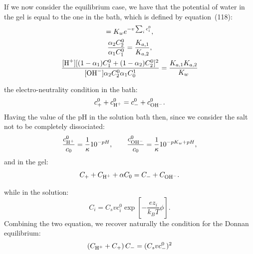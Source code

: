 \documentclass[12pt]{extarticle}
\begin{document}
If we now consider the equilibrium case, we have that the potential of water in the gel is equal to the one in the bath, which is defined by equation~(118):
\begin{gather}
[H^+][OH^-]=K_w e^{-v \sum_i c_i^0},\\
\frac{\alpha_2 C_2^0}{\alpha_1 C_1^0} =\frac{K_{a,1}}{K_{a,2}},\\
\frac{[\ce{H+}][(1-\alpha_1)C^0_1+(1-\alpha_2)C^0_2]^2}{[\ce{OH-}]\alpha_2 C^0_2\alpha_1 C_0^1} = \frac{K_{a,1} K_{a,2}}{K_w}
\end{gather}

the electro-neutrality condition in the bath:
\begin{equation}
c^0_+  + c^0_{\ce{H+}} = c^0_-+ c^0_{\ce{OH-}}. 
\end{equation}
Having the value of the pH in the solution bath then, since we consider the salt not to be completely dissociated:
\begin{equation}
\frac{c^0_{\ce{H+}}}{c_0} =  \frac{1}{\kappa} 10^{-pH}, \qquad \frac{c^0_{\ce{OH-}}}{c_0} = \frac{1}{\kappa} 10^{-pK_w+pH}, 
\end{equation}
and in the gel:
\begin{equation}
C_+  + C_{\ce{H+}} + \alpha C_0 = C_- + C_{\ce{OH-}}. 
\end{equation}

while in the solution:
\begin{equation}
C_i = C_s v c^0_i \exp\left[-\frac{ez_i}{k_BT}\phi\right].
\end{equation}
Combining the two equation, we recover naturally the condition for the Donnan equilibrium:
\begin{equation}
\left(C_{\ce{H+}}+C_+\right)C_- = (C_s v c^0_-)^2
\end{equation}
\appendix
\end{document}
